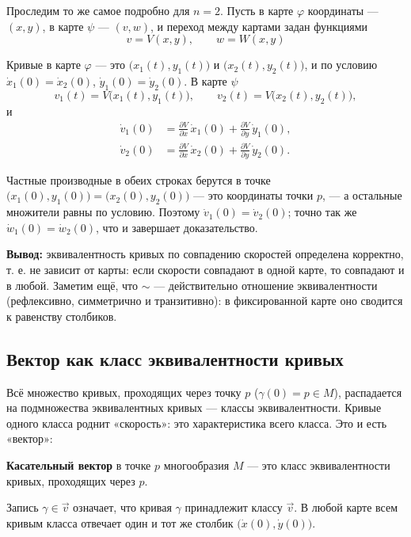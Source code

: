 \documentclass[11pt,a4paper]{article}
\begin{document}
Проследим то же самое подробно для $n = 2$. Пусть в карте $\varphi$ координаты — $(x, y)$, в карте $\psi$ — $(v, w)$, и переход между картами задан функциями
\[
\boxed{\; v = V(x, y), \qquad w = W(x, y) \;}
\]

Кривые в карте $\varphi$ — это $\bigl(x_1(t), y_1(t)\bigr)$ и $\bigl(x_2(t), y_2(t)\bigr)$, и по условию $\dot x_1(0) = \dot x_2(0)$, $\dot y_1(0) = \dot y_2(0)$. В карте $\psi$
\[
v_1(t) = V\bigl(x_1(t), y_1(t)\bigr), \qquad v_2(t) = V\bigl(x_2(t), y_2(t)\bigr),
\]
и
\[
\begin{aligned}
\dot v_1(0) &= \frac{\partial V}{\partial x}\,\dot x_1(0) + \frac{\partial V}{\partial y}\,\dot y_1(0), \\
\dot v_2(0) &= \frac{\partial V}{\partial x}\,\dot x_2(0) + \frac{\partial V}{\partial y}\,\dot y_2(0).
\end{aligned}
\]

Частные производные в обеих строках берутся в точке $\bigl(x_1(0), y_1(0)\bigr) = \bigl(x_2(0), y_2(0)\bigr)$ — это координаты точки $p$, — а остальные множители равны по условию. Поэтому $\dot v_1(0) = \dot v_2(0)$; точно так же $\dot w_1(0) = \dot w_2(0)$, что и завершает доказательство.

\textbf{Вывод:} эквивалентность кривых по совпадению скоростей определена корректно, т. е. не зависит от карты: если скорости совпадают в одной карте, то совпадают и в любой. Заметим ещё, что $\sim$ — действительно отношение эквивалентности (рефлексивно, симметрично и транзитивно): в фиксированной карте оно сводится к равенству столбиков.

\subsection{Вектор как класс эквивалентности кривых}

Всё множество кривых, проходящих через точку $p$ ($\gamma(0) = p \in M$), распадается на подмножества эквивалентных кривых — классы эквивалентности. Кривые одного класса роднит «скорость»: это характеристика всего класса. Это и есть «вектор»:

\textbf{Касательный вектор} в точке $p$ многообразия $M$ — это класс эквивалентности кривых, проходящих через $p$.

Запись $\gamma \in \vec v$ означает, что кривая $\gamma$ принадлежит классу $\vec v$. В любой карте всем кривым класса отвечает один и тот же столбик $\bigl(\dot x(0), \dot y(0)\bigr)$.

\end{document}
